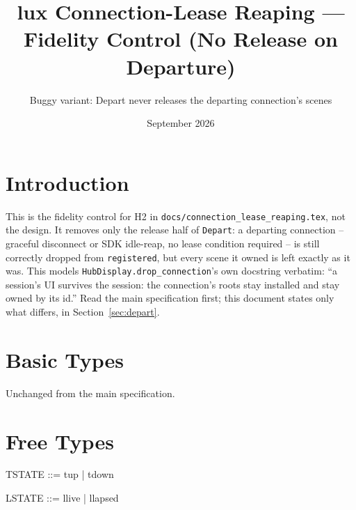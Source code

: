 \documentclass[a4paper,10pt,fleqn]{article}
\begin{document}
\title{lux Connection-Lease Reaping --- Fidelity Control (No Release on Departure)}
\author{Buggy variant: Depart never releases the departing connection's scenes}
\date{September 2026}
\maketitle

\section{Introduction}

This is the fidelity control for H2 in
\texttt{docs/connection\_lease\_reaping.tex}, not the design. It removes
only the release half of \texttt{Depart}: a departing connection --
graceful disconnect or SDK idle-reap, no lease condition required -- is
still correctly dropped from \texttt{registered}, but every scene it
owned is left exactly as it was. This models
\texttt{HubDisplay.drop\_connection}'s own docstring verbatim: ``a
session's UI survives the session: the connection's roots stay installed
and stay owned by its id.'' Read the main specification first; this
document states only what differs, in Section~\ref{sec:depart}.

\section{Basic Types}

\begin{zed}
\end{zed}

Unchanged from the main specification.

\section{Free Types}

\begin{zed}
  TSTATE ::= tup | tdown
\end{zed}

\begin{zed}
  LSTATE ::= llive | llapsed
\end{zed}
\end{document}
